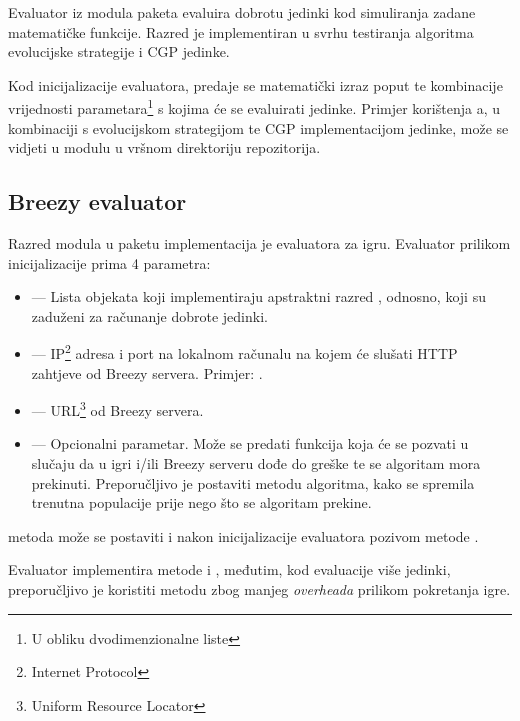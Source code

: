 \documentclass[times, utf8, zavrsni, numeric]{fer}
\begin{document}
Evaluator  iz modula
 paketa  evaluira dobrotu
jedinki kod simuliranja zadane matematičke funkcije. Razred je implementiran
u svrhu testiranja algoritma evolucijske strategije i CGP jedinke.

Kod inicijalizacije evaluatora, predaje se matematički izraz poput
 te kombinacije vrijednosti parametara\footnote{U obliku
dvodimenzionalne liste} s kojima će se evaluirati jedinke. Primjer korištenja
a, u kombinaciji s evolucijskom strategijom te CGP
implementacijom jedinke, može se vidjeti u modulu 
u vršnom direktoriju repozitorija.


\subsection{Breezy evaluator}
Razred  modula  u paketu
 implementacija je evaluatora za igru. Evaluator
prilikom inicijalizacije prima 4 parametra:
\begin{itemize}
    \item {} --- Lista objekata koji implementiraju apstraktni
        razred , odnosno, koji su zaduženi za računanje
        dobrote jedinki.
    \item {} --- IP\footnote{Internet Protocol} adresa i
        port na lokalnom računalu na kojem će  slušati
        HTTP zahtjeve od Breezy servera. Primjer: .
    \item {} --- URL\footnote{Uniform Resource Locator} od
        Breezy servera.
    \item {} --- Opcionalni parametar. Može se predati
        funkcija koja će se pozvati u slučaju da u igri i/ili Breezy serveru
        dođe do greške te se algoritam mora prekinuti. Preporučljivo je
        postaviti metodu  algoritma, kako se spremila
        trenutna populacije prije nego što se algoritam prekine.
\end{itemize}
 metoda može se postaviti i nakon inicijalizacije
evaluatora pozivom metode .

Evaluator implementira metode  i ,
međutim, kod evaluacije više jedinki, preporučljivo je koristiti metodu
 zbog manjeg \emph{overheada} prilikom pokretanja igre.
\end{document}
